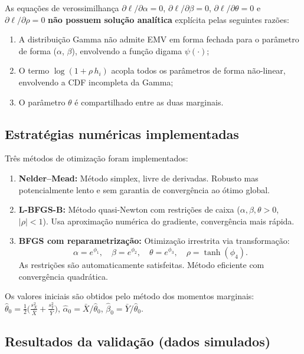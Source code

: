 \documentclass[12pt,a4paper]{article}
\begin{document}
As equações de verossimilhança $\partial\ell/\partial\alpha = 0$, $\partial\ell/\partial\beta = 0$, $\partial\ell/\partial\theta = 0$ e $\partial\ell/\partial\rho = 0$ \textbf{não possuem solução analítica} explícita pelas seguintes razões:
\begin{enumerate}
\item A distribuição Gamma não admite EMV em forma fechada para o parâmetro de forma ($\alpha$, $\beta$), envolvendo a função digama $\psi(\cdot)$;
\item O termo $\log(1 + \rho\,h_i)$ acopla todos os parâmetros de forma não-linear, envolvendo a CDF incompleta da Gamma;
\item O parâmetro $\theta$ é compartilhado entre as duas marginais.
\end{enumerate}

\subsection{Estratégias numéricas implementadas}

Três métodos de otimização foram implementados:

\begin{enumerate}
\item \textbf{Nelder--Mead:} Método simplex, livre de derivadas. Robusto mas potencialmente lento e sem garantia de convergência ao ótimo global.

\item \textbf{L-BFGS-B:} Método quasi-Newton com restrições de caixa ($\alpha, \beta, \theta > 0$, $|\rho| < 1$). Usa aproximação numérica do gradiente, convergência mais rápida.

\item \textbf{BFGS com reparametrização:} Otimização irrestrita via transformação:
\[
\alpha = e^{\phi_1}, \quad \beta = e^{\phi_2}, \quad \theta = e^{\phi_3}, \quad \rho = \tanh(\phi_4).
\]
As restrições são automaticamente satisfeitas. Método eficiente com convergência quadrática.
\end{enumerate}

Os valores iniciais são obtidos pelo método dos momentos marginais: $\hat\theta_0 = \frac{1}{2}\big(\frac{s_X^2}{\bar X} + \frac{s_Y^2}{\bar Y}\big)$, $\hat\alpha_0 = \bar X/\hat\theta_0$, $\hat\beta_0 = \bar Y/\hat\theta_0$.

\subsection{Resultados da validação (dados simulados)}
\end{document}
